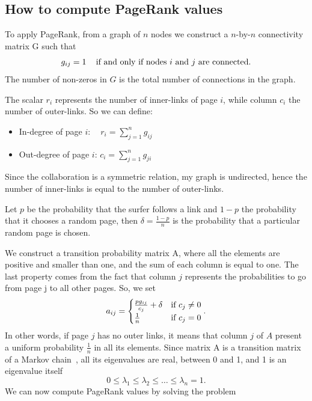 \documentclass[]{usiinfbachelorproject}
\newcommand\tab[1][1cm]{\hspace*{#1}}
\begin{document}
\subsection{How to compute PageRank values}
To apply PageRank, from a graph of $n$ nodes we construct a $n$-by-$n$ connectivity matrix G such that
\begin{equation*}
g_{ij}=1 \text{\;\;\; if and only if nodes $i$ and $j$ are connected.} 
\end{equation*}
The number of non-zeros in $G$ is the total number of connections in the graph.

The scalar $r_i$ represents the number of inner-links of page $i$, while column $c_i$ the number of outer-links. So we can define:
\begin{itemize}
\item In-degree of page $i$: \tab $\:\:\:\:r_i = \sum\limits_{j=1}^{n} g_{ij}$
\item Out-degree of page $i$: \tab $c_i = \sum\limits_{j=1}^{n} g_{ji}$
\end{itemize}
Since the collaboration is a symmetric relation, my graph is undirected, hence the number of inner-links is equal to the number of outer-links. 

Let $p$ be the probability that the surfer follows a link and $1-p$ the probability that it chooses a random page, then $\delta = \frac{1-p}{n}$ is the probability that a particular random page is chosen.

We construct a transition probability matrix A, where all the elements are positive and smaller than one, and the sum of each column is equal to one.
The last property comes from the fact that column $j$ represents the probabilities to go from page j to all other pages. So, we set
\begin{equation}\notag
a_{ij} = 
\begin{cases}
\frac{pg_{ij}}{c_{j}} + \delta  & \text{if } c_{j} \neq 0\\
\frac{1}{n} & \text{if } c_{j} = 0
\end{cases}.
\end{equation}
In other words, if page $j$ has no outer links, it means that column $j$ of $A$ present a uniform probability $\frac{1}{n}$ in all its elements. Since matrix A is a transition matrix of a Markov chain~\cite[Chapter 7]{markov}, all its eigenvalues are real, between 0 and 1, and 1 is an eigenvalue itself
$$0 \leq \lambda_1 \leq \lambda_2 \leq \dots \leq \lambda_n = 1 \text{.}$$
We can now compute PageRank values by solving the problem 
\end{document}
